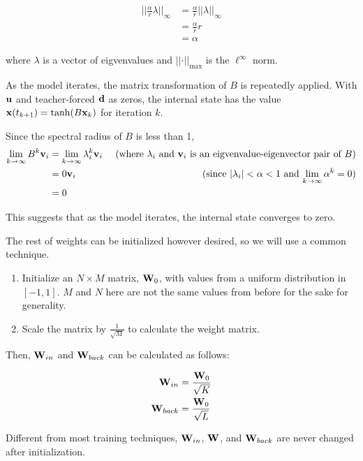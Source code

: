 \documentclass{article}
\begin{document}
\begin{align*}
    \vert\vert \frac{\alpha}{r} \lambda \vert\vert_\infty
    &= \frac{\alpha}{r} \vert\vert \lambda \vert\vert_\infty \\
    &= \frac{\alpha}{r} r \\
    &= \alpha
\end{align*}

where $\lambda$ is a vector of eigvenvalues and
$\vert \vert \cdot \vert \vert_\text{max}$ is the $\ell^\infty$ norm.

As the model iterates, the matrix transformation of $B$ is repeatedly 
applied. With $\mathbf{u}$ and teacher-forced $\mathbf{d}$ as zeros, the internal state
has the value $\mathbf{x}(t_{k+1}) = \tanh(B \mathbf{x}_k)$ for iteration $k$.

Since the spectral radius of $B$ is less than 1, 
\begin{align*}
    \lim_{k \to \infty}B^k \mathbf{v}_i &= \lim_{k \to \infty} \lambda_i^k \mathbf{v}_i & \text{ (where $\lambda_i$ and $\mathbf{v}_i$ is an eigvenvalue-eigenvector pair of $B$)} \\
    &= 0 \mathbf{v}_i & \text{ (since $\vert\lambda_i\vert < \alpha < 1$ and $\lim_{k \to \infty}\alpha^k = 0$)} \\
    &= 0
\end{align*}

This suggests that as the model iterates, the internal state converges to 
zero.

The rest of weights can be initialized however desired, so we will use a 
common technique.

\begin{enumerate}
    \item Initialize an $N \times M$ matrix, $\mathbf{W}_0$, with values from a 
    uniform distribution in $[-1, 1]$. $M$ and $N$ here are not the 
    same values from before for the sake for generality. 
    \item Scale the matrix by $\frac{1}{\sqrt{M}}$ to calculate the weight matrix.
\end{enumerate}

Then, $\mathbf{W}_{in}$ and $\mathbf{W}_{back}$ can be calculated as follows:

\begin{align}
    \mathbf{W}_{in} &= \frac{\mathbf{W}_0}{\sqrt{K}} \nonumber \\
    \mathbf{W}_{back} &= \frac{\mathbf{W}_0}{\sqrt{L}} \nonumber
\end{align}

Different from most training techniques, $\mathbf{W}_{in}$, $\mathbf{W}$, and $\mathbf{W}_{back}$ are
never changed after initialization.
\end{document}

